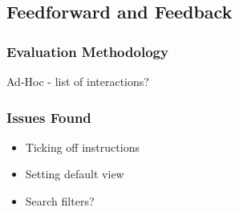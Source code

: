 \subsection{Feedforward and Feedback}

\subsubsection{Evaluation Methodology}

Ad-Hoc - list of interactions?

\subsubsection{Issues Found}

\begin{itemize}
\item Ticking off instructions
\item Setting default view
\item Search filters?
\end{itemize}
